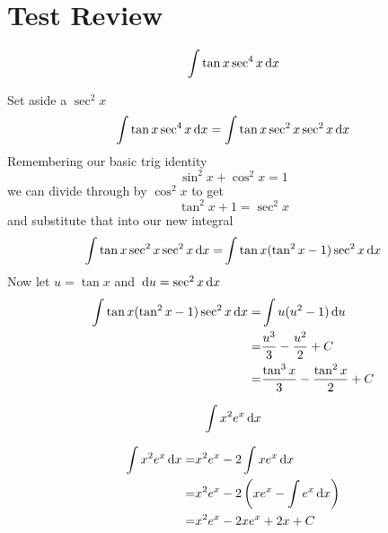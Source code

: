 \section{Test Review}
\begin{ex}
  \[ \int \tan x \sec^4x \,\mathrm{d} x \]
  \begin{sol}
    Set aside a $\sec^2x$
    \begin{align*}
      \int \tan x\sec^4x \,\mathrm{d} x
      = \int \tan x \sec^2 x \sec^2 x \,\mathrm{d} x
    \end{align*}
    Remembering our basic trig identity
    \[ \sin^2x + \cos^2x = 1\]
    we can divide through by $\cos^2x$ to get
    \[ \tan^2x+1=\sec^2x \]
    and substitute that into our new integral
    \begin{align*}
      \int \tan x \sec^2 x \sec^2 x \,\mathrm{d} x
      =& \int \tan x (\tan^2x-1) \sec^2x \,\mathrm{d} x \\
    \end{align*}
    Now let $u=\tan x$ and $\,\mathrm{d} u = \sec^2x \,\mathrm{d} x$
    \begin{align*}
      \int \tan x (\tan^2x-1) \sec^2x \,\mathrm{d} x
      =& \int u (u^2-1) \,\mathrm{d} u \\
      =& \frac{u^3}{3}-\frac{u^2}{2}+C \\
      =& \frac{\tan^3x}{3}-\frac{\tan^2x}{2} +C
    \end{align*}
  \end{sol}
\end{ex}
\begin{ex}
  \[ \int x^2 e^x \,\mathrm{d} x \]
  \begin{sol}
    \begin{align*}
      \int x^2 e^x\,\mathrm{d} x
      =& x^2 e^x-2\int x e^x \,\mathrm{d} x \\
      =& x^2 e^x -2 \left( x e^x - \int e^x \,\mathrm{d} x \right) \\
      =& x^2 e^x -2 x e^x +2x +C
    \end{align*}
  \end{sol}
\end{ex}
